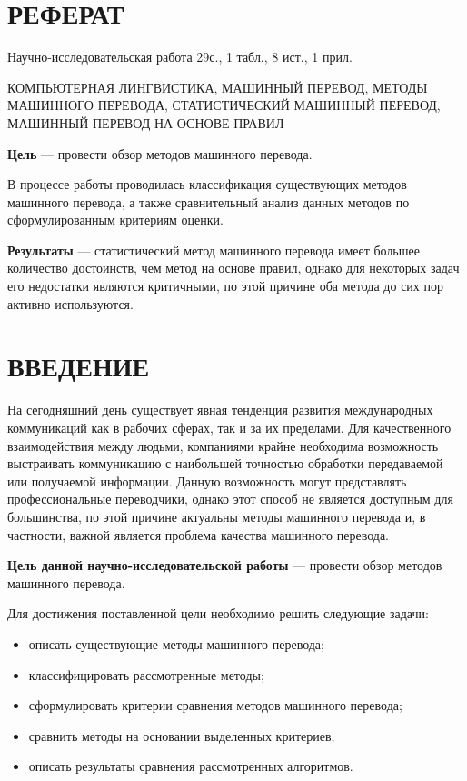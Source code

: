 \chapter*{РЕФЕРАТ}

Научно-исследовательская работа 29с., 1 табл., 8 ист., 1 прил.

КОМПЬЮТЕРНАЯ ЛИНГВИСТИКА, МАШИННЫЙ ПЕРЕВОД, МЕТОДЫ МАШИННОГО ПЕРЕВОДА, СТАТИСТИЧЕСКИЙ МАШИННЫЙ ПЕРЕВОД, МАШИННЫЙ ПЕРЕВОД НА ОСНОВЕ ПРАВИЛ

\textbf{Цель} --- провести обзор методов машинного перевода.

В процессе работы проводилась классификация существующих методов машинного перевода, а также сравнительный анализ данных методов по сформулированным критериям оценки.

\textbf{Результаты} --- статистический метод машинного перевода имеет большее количество достоинств, чем метод на основе правил, однако для некоторых задач его недостатки являются критичными, по этой причине оба метода до сих пор активно используются.


\chapter*{ВВЕДЕНИЕ}

На сегодняшний день существует явная тенденция развития международных коммуникаций как в рабочих сферах, так и за их пределами. Для качественного взаимодействия между людьми, компаниями крайне необходима возможность выстраивать коммуникацию с наибольшей точностью обработки передаваемой или получаемой информации. Данную возможность могут представлять профессиональные переводчики, однако этот способ не является доступным для большинства, по этой причине актуальны методы машинного перевода и, в частности, важной является проблема качества машинного перевода.

\textbf{Цель данной научно-исследовательской работы} --- провести обзор методов машинного перевода.

Для достижения поставленной цели необходимо решить следующие задачи:
\begin{itemize}[label=---]
	\item описать существующие методы машинного перевода;
    \item классифицировать рассмотренные методы;
    \item сформулировать критерии сравнения методов машинного перевода;
	\item сравнить методы на основании выделенных критериев;
	\item описать результаты сравнения рассмотренных алгоритмов.
\end{itemize}